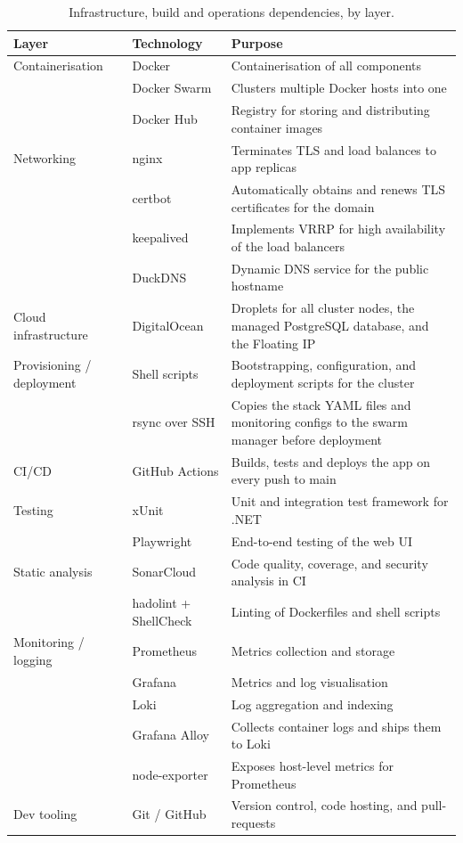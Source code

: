 {\begin{table}[H]
    \centering
    \caption{Infrastructure, build and operations dependencies, by layer.}
    \label{tab:dependencies-infra}
    \small
    \begin{tabularx}{\linewidth}{l l X}
        \toprule
        \textbf{Layer} & \textbf{Technology} & \textbf{Purpose} \\
        \midrule
        Containerisation & Docker & Containerisation of all components \\
            & Docker Swarm & Clusters multiple Docker hosts into one \\
            & Docker Hub & Registry for storing and distributing container images \\
        \midrule
        Networking & nginx & Terminates TLS and load balances to app replicas \\
            & certbot & Automatically obtains and renews TLS certificates for the domain \\
            & keepalived & Implements VRRP for high availability of the load balancers \\
            & DuckDNS & Dynamic DNS service for the public hostname \\
        \midrule
        Cloud infrastructure & DigitalOcean & Droplets for all cluster nodes, the managed PostgreSQL database, and the Floating IP\\
        \midrule
        Provisioning / deployment & Shell scripts & Bootstrapping, configuration, and deployment scripts for the cluster \\
            & rsync over SSH & Copies the stack YAML files and monitoring configs to the swarm manager before deployment \\
        \midrule
        CI/CD & GitHub Actions & Builds, tests and deploys the app on every push to main \\
        \midrule
        Testing & xUnit & Unit and integration test framework for .NET \\
            & Playwright & End-to-end testing of the web UI \\
        \midrule
        Static analysis & SonarCloud & Code quality, coverage, and security analysis in CI \\
            & hadolint + ShellCheck & Linting of Dockerfiles and shell scripts \\
        \midrule
        Monitoring / logging & Prometheus & Metrics collection and storage \\
            & Grafana & Metrics and log visualisation \\
            & Loki & Log aggregation and indexing \\
            & Grafana Alloy & Collects container logs and ships them to Loki \\
            & node-exporter & Exposes host-level metrics for Prometheus \\
        \midrule
        Dev tooling & Git / GitHub & Version control, code hosting, and pull-requests \\
        \bottomrule
    \end{tabularx}
\end{table}

}
